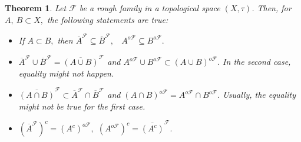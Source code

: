 \documentclass[10pt,a4paper]{amsart}
\newtheorem{theorem}{Theorem}
\begin{document}
\begin{theorem}
    Let $\mathscr{F}$ be a rough family in a topological space $(X,\tau)$. Then, for $A, ~B\subset X,$ the following statements are true:
    \begin{itemize}
        \item[(i)] If $A\subset B,$ then $\overline{A}^\mathscr{F}\subseteq \overline{B}^\mathscr{F},$ ~$A^{o\mathscr{F}}\subseteq B^{o\mathscr{F}}.$
        
        \item[(ii)] $\overline{A}^\mathscr{F}\cup\overline{B}^\mathscr{F}= \overline{(A\cup B)}^\mathscr{F}$ and $A^{o\mathscr{F}}\cup B^{o\mathscr{F}}\subset (A\cup B)^{o\mathscr{F}}.$ In the second case, equality might not happen.
        
        \item[(iii)] $\overline{(A\cap B)}^\mathscr{F}\subset \overline{A}^\mathscr{F}\cap\overline{B}^\mathscr{F}$ and $(A\cap B)^{o\mathscr{F}}=A^{o\mathscr{F}}\cap B^{o\mathscr{F}}.$ Usually, the equality might not be true for the first case.
        
        \item[(iv)] $\left(\overline{A}^\mathscr{F}\right)^c=(A^c)^{o\mathscr{F}},$ $\left(A^{o\mathscr{F}}\right)^c=\overline{(A^c)}^\mathscr{F}.$
    \end{itemize}
\end{theorem}
\end{document}

